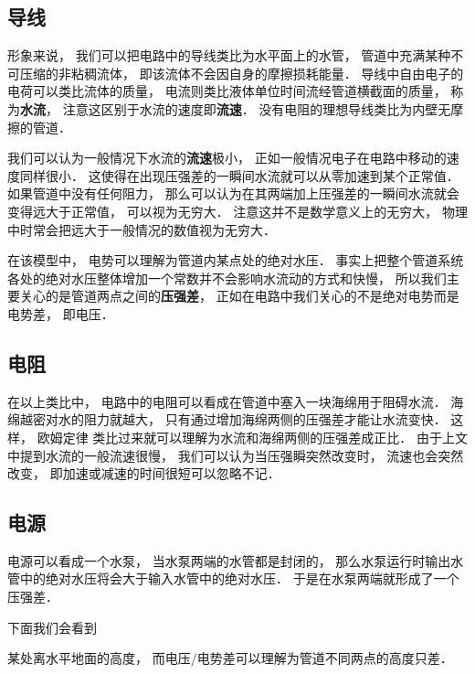 

\subsection{导线}
形象来说， 我们可以把电路中的导线类比为水平面上的水管， 管道中充满某种不可压缩的非粘稠流体， 即该流体不会因自身的摩擦损耗能量． 导线中自由电子的电荷可以类比流体的质量， 电流则类比液体单位时间流经管道横截面的质量， 称为\textbf{水流}， 注意这区别于水流的速度即\textbf{流速}． 没有电阻的理想导线类比为内壁无摩擦的管道．

我们可以认为一般情况下水流的\textbf{流速}极小， 正如一般情况电子在电路中移动的速度同样很小． 这使得在出现压强差的一瞬间水流就可以从零加速到某个正常值． 如果管道中没有任何阻力， 那么可以认为在其两端加上压强差的一瞬间水流就会变得远大于正常值， 可以视为无穷大． 注意这并不是数学意义上的无穷大， 物理中时常会把远大于一般情况的数值视为无穷大．

在该模型中， 电势可以理解为管道内某点处的绝对水压． 事实上把整个管道系统各处的绝对水压整体增加一个常数并不会影响水流动的方式和快慢， 所以我们主要关心的是管道两点之间的\textbf{压强差}， 正如在电路中我们关心的不是绝对电势而是电势差， 即电压．

\subsection{电阻}
在以上类比中， 电路中的电阻可以看成在管道中塞入一块海绵用于阻碍水流． 海绵越密对水的阻力就越大， 只有通过增加海绵两侧的压强差才能让水流变快． 这样， 欧姆定律 类比过来就可以理解为水流和海绵两侧的压强差成正比． 由于上文中提到水流的一般流速很慢， 我们可以认为当压强瞬突然改变时， 流速也会突然改变， 即加速或减速的时间很短可以忽略不记．

\subsection{电源}
电源可以看成一个水泵， 当水泵两端的水管都是封闭的， 那么水泵运行时输出水管中的绝对水压将会大于输入水管中的绝对水压． 于是在水泵两端就形成了一个压强差．




下面我们会看到

某处离水平地面的高度， 而电压/电势差可以理解为管道不同两点的高度只差．
